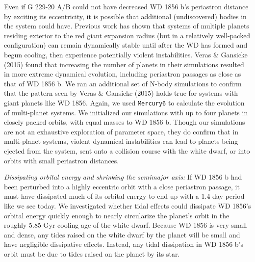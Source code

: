 \documentclass{nature3}
\begin{document}
\begin{methods}
Even if G 229-20 A/B could not have decreased WD 1856 b's periastron distance by exciting its eccentricity, it is possible that additional (undiscovered) bodies in the system could have.  Previous work \cite{debes2002, verasunpacking} has shown that systems of multiple planets residing exterior to the red giant expansion radius (but in a relatively well-packed configuration) can remain dynamically stable until after the WD has formed and begun cooling, then experience potentially violent instabilities.  Veras \& Gansicke (2015\cite{verasunpacking}) found that increasing the number of planets in their simulations resulted in more extreme dynamical evolution, including periastron passages as close as that of WD 1856 b. We ran an additional set of N-body simulations to confirm that the pattern seen by  Veras \& Gansicke (2015) holds true for systems with giant planets like WD 1856. Again, we used \texttt{Mercury6} to calculate the evolution of multi-planet systems. We initialized our simulations with up to four planets in closely packed orbits, with equal masses to WD 1856 b. Though our simulations are not an exhaustive exploration of parameter space, they do confirm that in multi-planet systems, violent dynamical instabilities can lead to planets being ejected from the system, sent onto a collision course with the white dwarf, or into orbits with small periastron distances.  




\textit{Dissipating orbital energy and shrinking the semimajor axis:} If WD 1856 b had been perturbed into a highly eccentric orbit with a close periastron passage, it must have dissipated much of its orbital energy to end up with a 1.4 day period like we see today. We investigated whether tidal effects could dissipate WD 1856's orbital energy quickly enough to nearly circularize the planet's orbit in the roughly 5.85 Gyr cooling age of the white dwarf. Because WD 1856 is very small and dense, any tides raised on the white dwarf by the planet will be small and have negligible dissipative effects. Instead, any tidal dissipation in WD 1856 b's orbit must be due to tides raised on the planet by its star. 


\end{methods}
\end{document}

